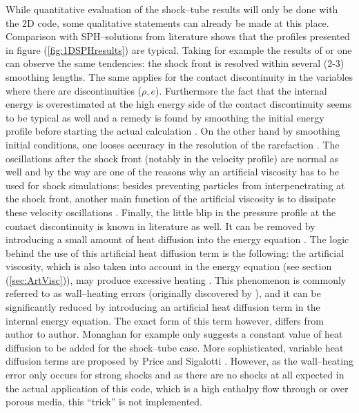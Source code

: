 \documentclass[11pt,a4paper,twoside]{report}
\begin{document}
While quantitative evaluation of the shock--tube results will only be done with the 2D code, some qualitative statements can already be made at this place.
Comparison with SPH--solutions from literature shows that the profiles presented in figure (\ref{fig:1DSPHresults}) are typical. Taking for example the results of \cite{Liu2003} or \cite{Monaghan1985} one can observe the same tendencies: the shock front is resolved within several (2-3) smoothing lengths. The same applies for the contact discontinuity in the variables where there are discontinuities ($\rho, e$). Furthermore the fact that the internal energy is overestimated at the high energy side of the contact discontinuity seems to be typical as well and a remedy is found by smoothing the initial energy profile before starting the actual calculation \cite{Monaghan2005,Price2004}. On the other hand by smoothing initial conditions, one looses accuracy in the resolution of the rarefaction \cite{Price2004}. The oscillations after the shock front (notably in the velocity profile) are normal as well and by the way are one of the reasons why an artificial viscosity has to be used for shock simulations: besides preventing particles from interpenetrating at the shock front, another main function of the artificial viscosity is to dissipate these velocity oscillations \cite{Monaghan2005,Sigalotti2006}.
Finally, the little blip in the pressure profile at the contact discontinuity is known in literature as well. It can be removed by introducing a small amount of heat diffusion into the energy equation \cite{Monaghan1992}. The logic behind the use of this artificial heat diffusion term is the following: the artificial viscosity, which is also taken into account in the energy equation (see section (\ref{sec:ArtVisc})), may produce excessive heating \cite{Sigalotti2006}. This phenomenon is commonly referred to as wall--heating errors (originally discovered by \cite{Noh1978}), and it can be significantly reduced by introducing an artificial heat diffusion term in the internal energy equation. The exact form of this term however, differs from author to author. Monaghan \cite{Monaghan1992} for example only suggests a constant value of heat diffusion to be added for the shock--tube case. More sophisticated, variable heat diffusion terms are proposed by Price \cite{Price2004} and Sigalotti \cite{Sigalotti2006}.
However, as the wall--heating error only occurs for strong shocks and as there are no shocks at all expected in the actual application of this code, which is a high enthalpy flow through or over porous media, this ``trick'' is not implemented. 
\end{document}
